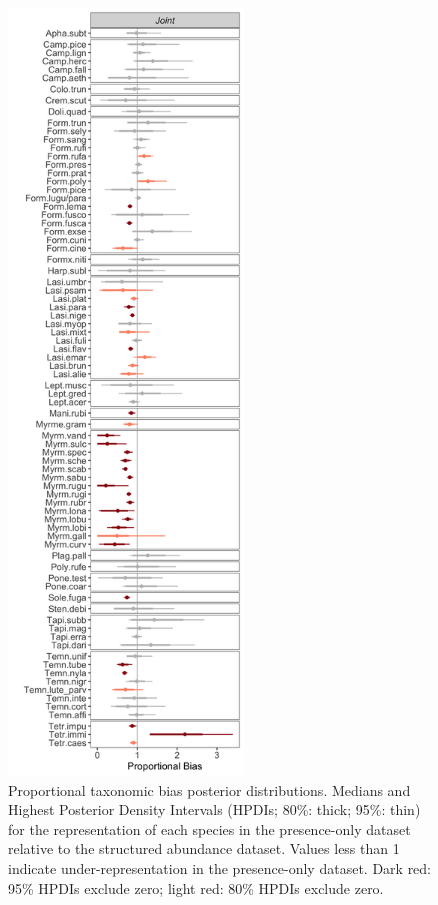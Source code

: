 \documentclass[preprint,review,times,12pt,3p]{elsarticle}
\begin{document}
\begin{figure}
	\centering\includegraphics[height=8in]{ms/1_Ecography/1/figs/D.png}
	\caption{\label{fig:D} Proportional taxonomic bias posterior distributions. Medians and Highest Posterior Density Intervals (HPDIs; 80\%: thick; 95\%: thin) for the representation of each species in the presence-only dataset relative to the structured abundance dataset. Values less than 1 indicate under-representation in the presence-only dataset. Dark red: 95\% HPDIs exclude zero; light red: 80\% HPDIs exclude zero. }
\end{figure}
\end{document}
